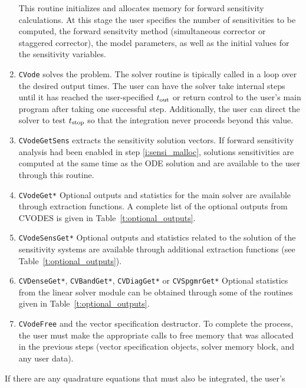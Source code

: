 \begin{enumerate}
  This routine initializes and allocates memory for forward sensitivity calculations.
  At this stage the user specifies the number of sensitivities to be computed, 
  the forward sensitvity method (simultaneous corrector or staggered corrector), 
  the model parameters, as well as the initial values for the sensitivity variables.
\item \label{i:solve}
  {\tt CVode} 
  solves the problem. 
  The solver routine is tipically called in a loop over the desired output times.
  The user can have the solver take internal steps until it has reached the
  user-specified $t_{\mbox{\scriptsize out}}$ or return control to the user's
  main program after taking one successful step. Additionally, the user can
  direct the solver to test $t_{\mbox{\scriptsize stop}}$ so that the
  integration never proceeds beyond this value.
\item \label{i:getsensi}
  {\tt CVodeGetSens}
  extracts the sensitivity solution vectors. If forward sensitivity analysis
  had been enabled in step \ref{i:sensi_malloc}, solutions sensitivities are
  computed at the same time as the ODE solution and are available to the user
  through this routine.
\item \label{i:get}
  {\tt CVodeGet*} 
  Optional outputs and statistics for the main solver are available through 
  extraction functions. A complete list of the optional outputs from CVODES 
  is given in Table~\ref{t:optional_outputs}.
\item \label{i:sensi_get}
  {\tt CVodeSensGet*}
  Optional outputs and statistics related to the solution of the sensitivity 
  systems are available through additional extraction functions 
  (see Table~\ref{t:optional_outputs}).
\item \label{i:ls_get}  
  {\tt CVDenseGet*}, {\tt CVBandGet*}, {\tt CVDiagGet*} or {\tt CVSpgmrGet*}
  Optional statistics from the linear solver module can be obtained through
  some of the routines given in Table~\ref{t:optional_outputs}.
\item \label{i:free}
  {\tt CVodeFree} and the vector specification destructor.
  To complete the process, the user must make the appropriate calls to
  free memory that was allocated in the previous steps 
  (vector specification objects, solver memory block, and any user data).
\end{enumerate}
%
%
If there are any quadrature equations that must also be integrated, the user's 

